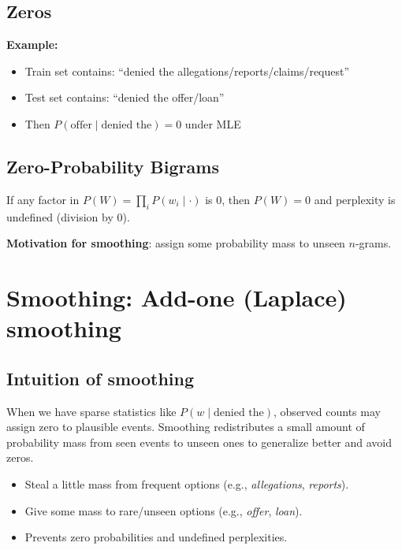 \documentclass[11pt,a4paper]{article}
\theoremstyle{definition}
\theoremstyle{plain}
\theoremstyle{remark}
\begin{document}
\subsection{Zeros}

\textbf{Example:}
\begin{itemize}
    \item Train set contains: ``denied the allegations/reports/claims/request''
    \item Test set contains: ``denied the offer/loan''
    \item Then $P(\text{offer} \mid \text{denied the}) = 0$ under MLE
\end{itemize}

\subsection{Zero-Probability Bigrams}

\begin{tcolorbox}[colback=red!5!white,colframe=red!75!black,title=\textbf{Why zeros are fatal}]
If any factor in $P(W)=\prod_i P(w_i\mid \cdot)$ is 0, then $P(W)=0$ and perplexity is undefined (division by 0).
\end{tcolorbox}

\textbf{Motivation for smoothing}: assign some probability mass to unseen $n$-grams.

\section{Smoothing: Add-one (Laplace) smoothing}

\subsection{Intuition of smoothing}
When we have sparse statistics like $P(w\mid \text{denied the})$, observed counts may assign zero to plausible events. Smoothing redistributes a small amount of probability mass from seen events to unseen ones to generalize better and avoid zeros.
\begin{itemize}
    \item Steal a little mass from frequent options (e.g., \textit{allegations}, \textit{reports}).
    \item Give some mass to rare/unseen options (e.g., \textit{offer}, \textit{loan}).
    \item Prevents zero probabilities and undefined perplexities.
\end{itemize}
\end{document}
